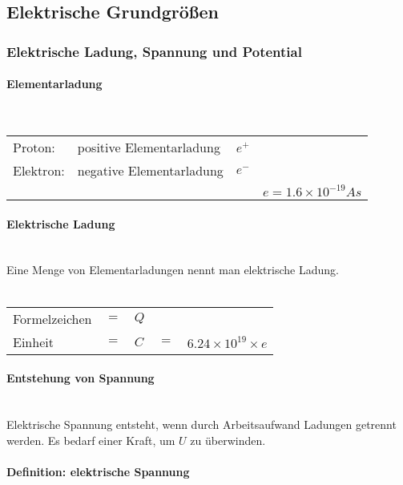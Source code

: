 
\subsection{Elektrische Grundgrößen}
	\subsubsection{Elektrische Ladung, Spannung und Potential}
		\paragraph{Elementarladung}~\\
		
\begin{tabular}{llll}
Proton:		& positive Elementarladung &	$e^+$ & \\
Elektron:	& negative Elementarladung &	$e^-$ & \\
& &	& $e = 1.6 \times 10^{-19} As$ \\
\end{tabular}

		\paragraph{Elektrische Ladung}~\\
		
\noindent Eine Menge von Elementarladungen nennt man elektrische Ladung.\\\\
\begin{tabular}{lllll}
Formelzeichen	& $=$ & $Q$ & & \\
Einheit			& $=$ & $C$ & $=$ & $6.24 \times 10^{19} \times e$
\end{tabular}	
		
		\paragraph{Entstehung von Spannung}~\\
		
\noindent Elektrische Spannung entsteht, wenn durch Arbeitsaufwand Ladungen getrennt werden. Es bedarf einer Kraft, um $U$ zu überwinden.
		
		\paragraph{Definition: elektrische Spannung}~\\

